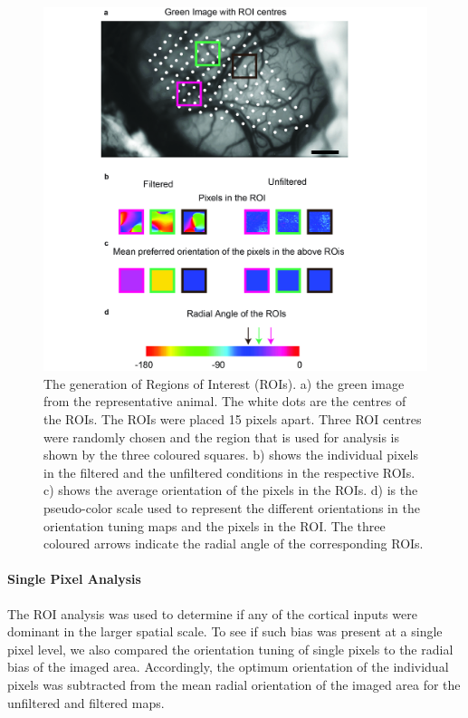 			\begin{figure}[H]
			
			\includegraphics[width=\linewidth]{rb/FinalFigures/ROI.jpg}
			\caption{The generation of Regions of Interest (ROIs). a) the green image from the representative animal. The white dots are the centres of the ROIs. The ROIs were placed 15 pixels apart. Three ROI centres were randomly chosen and the region that is used for analysis is shown by the three coloured squares. b) shows the individual pixels in the filtered and the unfiltered conditions in the respective ROIs. c) shows the average orientation of the pixels in the ROIs. d) is the pseudo-color scale used to represent the different orientations in the orientation tuning maps and the pixels in the ROI. The three coloured arrows indicate the radial angle of the corresponding ROIs.}
			\label{fig:roi}
		\end{figure}
		
		\paragraph{Single Pixel Analysis}	
		
		The ROI analysis was used to determine if any of the cortical inputs were dominant in the larger spatial scale. To see if such bias was present at a single pixel level, we also compared the orientation tuning of single pixels to the radial bias of the imaged area. Accordingly, the optimum orientation of the individual pixels was subtracted from the mean radial orientation of the imaged area for the unfiltered and filtered maps. 
		
